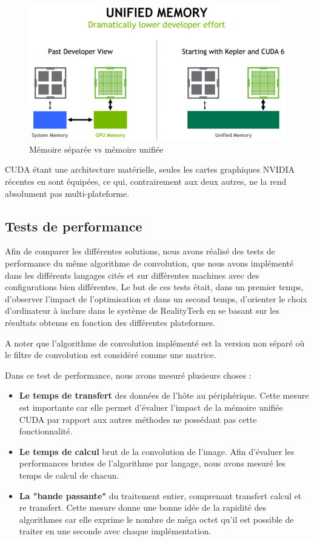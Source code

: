 \begin{figure}[H]
\centering
\includegraphics[width=0.65\linewidth]{images/cuda-unified-memory}
\caption{Mémoire séparée vs mémoire unifiée\protect\footnotemark}
\label{fig:cuda:unifiedmemory}
\end{figure}

CUDA étant une architecture matérielle, seules les cartes graphiques NVIDIA récentes en sont équipées, ce qui, contrairement aux deux autres, ne la rend absolument pas multi-plateforme.

\subsection{Tests de performance}
\label{sub:conv:bench}
Afin de comparer les différentes solutions, nous avons réalisé des tests de performance du même algorithme de convolution, que nous avons implémenté dans les différents langages cités et sur différentes machines avec des configurations bien différentes. Le but de ces tests était, dans un premier temps, d'observer l'impact de l'optimisation et dans un second temps, d'orienter le choix d'ordinateur à inclure dans le système de RealityTech en se basant sur les résultats obtenus en fonction des différentes plateformes.

A noter que l'algorithme de convolution implémenté est la version non séparé où le filtre de convolution est considéré comme une matrice.

Dans ce test de performance, nous avons mesuré plusieurs choses :
\begin{itemize}
\item \textbf{Le temps de transfert} des données de l'hôte au périphérique. Cette mesure est importante car elle permet d'évaluer l'impact de la mémoire unifiée CUDA par rapport aux autres méthodes ne possédant pas cette fonctionnalité.
\item \textbf{Le temps de calcul} brut de la convolution de l'image. Afin d'évaluer les performances brutes de l'algorithme par langage, nous avons mesuré les temps de calcul de chacun.
\item \textbf{La "bande passante"} du traitement entier, comprenant transfert calcul et re transfert. Cette mesure donne une bonne idée de la rapidité des algorithmes car elle exprime le nombre de méga octet qu'il est possible de traiter en une seconde avec chaque implémentation.
\end{itemize}

